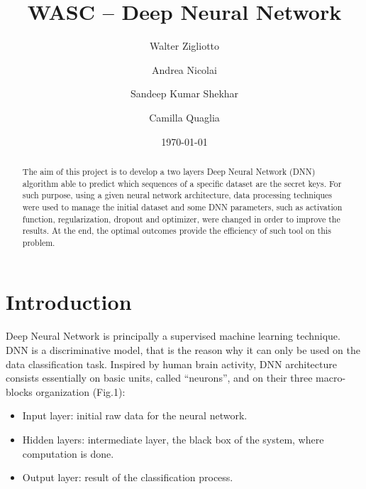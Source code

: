 \documentclass[prl,twocolumn]{revtex4-1}
\begin{document}
\title{WASC -- Deep Neural Network}





\author{Walter Zigliotto}
\author{Andrea Nicolai}
\author{Sandeep Kumar Shekhar}
\author{Camilla Quaglia}

\date{\today}


\begin{abstract}
	
The aim of this project is to develop a two layers Deep Neural Network (DNN) algorithm able to predict which sequences of a specific dataset are the secret keys. For such purpose, using a given neural network architecture, data processing techniques were used to manage the initial dataset and some DNN parameters, such as activation function, regularization, dropout and optimizer, were changed in order to improve the results. At the end, the optimal outcomes provide the efficiency of such tool on this problem.

\end{abstract}

\maketitle


\section{Introduction}

Deep Neural Network is principally a supervised machine learning technique. DNN is a discriminative model, that is the reason why it can only be used on the data classification task. Inspired by human brain activity, DNN architecture consists essentially on basic units, called “neurons”, and on their three macro-blocks organization (Fig.1):
{
\begin{itemize}
	\item Input layer: initial raw data for the neural network.
	\item Hidden layers: intermediate layer, the black box of the system, where computation is done.
	\item Output layer: result of the classification process.
\end{itemize}
}
\end{document}
